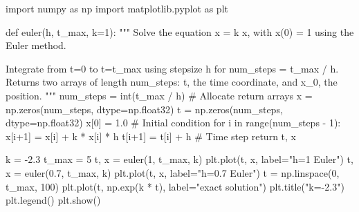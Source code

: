 \documentclass[
  letterpaper,
  DIV=11,
  numbers=noendperiod]{scrreprt}
\newenvironment{Shaded}{\begin{snugshade}}{\end{snugshade}}
\newcommand{\BuiltInTok}[1]{\textcolor[rgb]{0.00,0.23,0.31}{#1}}
\newcommand{\CommentTok}[1]{\textcolor[rgb]{0.37,0.37,0.37}{#1}}
\newcommand{\ControlFlowTok}[1]{\textcolor[rgb]{0.00,0.23,0.31}{#1}}
\newcommand{\DecValTok}[1]{\textcolor[rgb]{0.68,0.00,0.00}{#1}}
\newcommand{\FloatTok}[1]{\textcolor[rgb]{0.68,0.00,0.00}{#1}}
\newcommand{\ImportTok}[1]{\textcolor[rgb]{0.00,0.46,0.62}{#1}}
\newcommand{\KeywordTok}[1]{\textcolor[rgb]{0.00,0.23,0.31}{#1}}
\newcommand{\NormalTok}[1]{\textcolor[rgb]{0.00,0.23,0.31}{#1}}
\newcommand{\OperatorTok}[1]{\textcolor[rgb]{0.37,0.37,0.37}{#1}}
\newcommand{\StringTok}[1]{\textcolor[rgb]{0.13,0.47,0.30}{#1}}
\theoremstyle{definition}
\theoremstyle{remark}
\begin{document}
\begin{Shaded}
\begin{Highlighting}[]
\ImportTok{import}\NormalTok{ numpy }\ImportTok{as}\NormalTok{ np}
\ImportTok{import}\NormalTok{ matplotlib.pyplot }\ImportTok{as}\NormalTok{ plt}

\KeywordTok{def}\NormalTok{ euler(h, t\_max, k}\OperatorTok{=}\DecValTok{1}\NormalTok{):}
    \CommentTok{"""}
\CommentTok{    Solve the equation x\textquotesingle{} = k x, with x(0) = 1 using}
\CommentTok{    the Euler method. }

\CommentTok{    Integrate from t=0 to t=t\_max using stepsize h for}
\CommentTok{    num\_steps = t\_max / h.}
\CommentTok{    }
\CommentTok{    Returns two arrays of length num\_steps: t, the time coordinate, and x\_0, the position.}
\CommentTok{    """}
\NormalTok{    num\_steps }\OperatorTok{=} \BuiltInTok{int}\NormalTok{(t\_max }\OperatorTok{/}\NormalTok{ h)}
    \CommentTok{\# Allocate return arrays}
\NormalTok{    x }\OperatorTok{=}\NormalTok{ np.zeros(num\_steps, dtype}\OperatorTok{=}\NormalTok{np.float32)}
\NormalTok{    t }\OperatorTok{=}\NormalTok{ np.zeros(num\_steps, dtype}\OperatorTok{=}\NormalTok{np.float32)}
\NormalTok{    x[}\DecValTok{0}\NormalTok{] }\OperatorTok{=} \FloatTok{1.0}  \CommentTok{\# Initial condition}
    \ControlFlowTok{for}\NormalTok{ i }\KeywordTok{in} \BuiltInTok{range}\NormalTok{(num\_steps }\OperatorTok{{-}} \DecValTok{1}\NormalTok{):}
\NormalTok{        x[i}\OperatorTok{+}\DecValTok{1}\NormalTok{] }\OperatorTok{=}\NormalTok{ x[i] }\OperatorTok{+}\NormalTok{ k }\OperatorTok{*}\NormalTok{ x[i] }\OperatorTok{*}\NormalTok{ h}
\NormalTok{        t[i}\OperatorTok{+}\DecValTok{1}\NormalTok{] }\OperatorTok{=}\NormalTok{ t[i] }\OperatorTok{+}\NormalTok{ h  }\CommentTok{\# Time step}
    \ControlFlowTok{return}\NormalTok{ t, x}

\NormalTok{k }\OperatorTok{=} \OperatorTok{{-}}\FloatTok{2.3}
\NormalTok{t\_max }\OperatorTok{=} \DecValTok{5}
\NormalTok{t, x }\OperatorTok{=}\NormalTok{ euler(}\DecValTok{1}\NormalTok{, t\_max, k)}
\NormalTok{plt.plot(t, x, label}\OperatorTok{=}\StringTok{"h=1 Euler"}\NormalTok{)}
\NormalTok{t, x }\OperatorTok{=}\NormalTok{ euler(}\FloatTok{0.7}\NormalTok{, t\_max, k)}
\NormalTok{plt.plot(t, x, label}\OperatorTok{=}\StringTok{"h=0.7 Euler"}\NormalTok{)}
\NormalTok{t }\OperatorTok{=}\NormalTok{ np.linspace(}\DecValTok{0}\NormalTok{, t\_max, }\DecValTok{100}\NormalTok{)}
\NormalTok{plt.plot(t, np.exp(k }\OperatorTok{*}\NormalTok{ t), label}\OperatorTok{=}\StringTok{"exact solution"}\NormalTok{)}
\NormalTok{plt.title(}\StringTok{"k={-}2.3"}\NormalTok{)}
\NormalTok{plt.legend()}
\NormalTok{plt.show()}
\end{Highlighting}
\end{Shaded}
\end{document}
